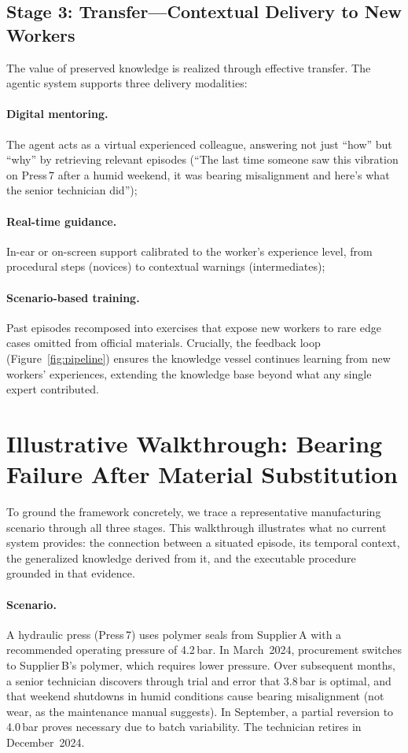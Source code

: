 \documentclass[]{ceurart}
\begin{document}
\subsection{Stage 3: Transfer---Contextual Delivery to New
  Workers}\label{sec:transfer}

The value of preserved knowledge is realized through effective transfer.
The agentic system supports three delivery modalities:

\paragraph{Digital mentoring.}
The agent acts as a virtual experienced
colleague, answering not just ``how'' but ``why'' by retrieving relevant
episodes (``The last time someone saw this vibration on Press\,7 after a
humid weekend, it was bearing misalignment and here's what the senior
technician did'');

\paragraph{Real-time guidance.}
In-ear or on-screen support calibrated
to the worker's experience level, from procedural steps (novices) to
contextual warnings (intermediates);

\paragraph{Scenario-based training.}
Past episodes recomposed into exercises that expose new workers to rare edge cases omitted from
official materials. Crucially, the feedback loop
(Figure~\ref{fig:pipeline}) ensures the knowledge vessel continues
learning from new workers' experiences, extending the knowledge base
beyond what any single expert contributed.


\section{Illustrative Walkthrough: Bearing Failure After Material
  Substitution}\label{sec:walkthrough}

To ground the framework concretely, we trace a representative
manufacturing scenario through all three stages. This walkthrough illustrates what no current system provides: the
connection between a situated episode, its temporal context, the
generalized knowledge derived from it, and the executable procedure
grounded in that evidence.

\paragraph{Scenario.} A hydraulic press (Press\,7) uses polymer seals
from Supplier\,A with a recommended operating pressure of 4.2\,bar. In
March~2024, procurement switches to Supplier\,B's polymer, which
requires lower pressure. Over subsequent months, a senior technician
discovers through trial and error that 3.8\,bar is optimal, and that
weekend shutdowns in humid conditions cause bearing misalignment (not
wear, as the maintenance manual suggests). In September, a partial
reversion to 4.0\,bar proves necessary due to batch variability. The
technician retires in December~2024.
\end{document}

